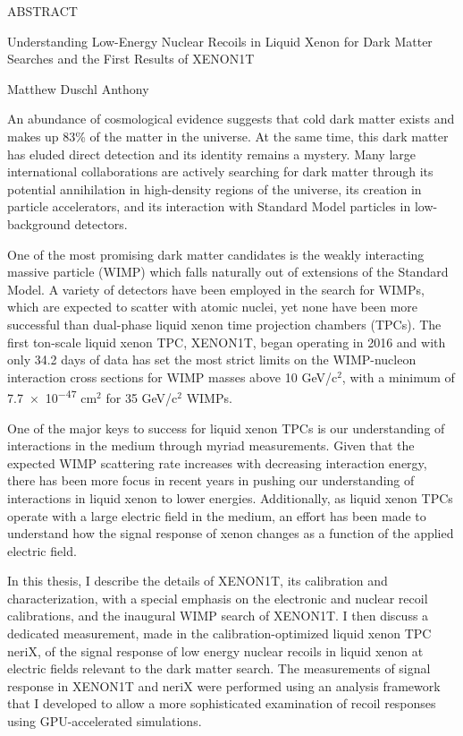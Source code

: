 
\pagestyle{empty} %
\begin{center}
  ABSTRACT

    Understanding Low-Energy Nuclear Recoils in Liquid Xenon for Dark Matter Searches and the First Results of XENON1T

    Matthew Duschl Anthony
\end{center}

An abundance of cosmological evidence suggests that cold dark matter exists and makes up 83\% of the matter in the universe.  At the same time, this dark matter has eluded direct detection and its identity remains a mystery.  Many large international collaborations are actively searching for dark matter through its potential annihilation in high-density regions of the universe, its creation in particle accelerators, and its interaction with Standard Model particles in low-background detectors.

One of the most promising dark matter candidates is the weakly interacting massive particle (WIMP) which falls naturally out of extensions of the Standard Model.  A variety of detectors have been employed in the search for WIMPs, which are expected to scatter with atomic nuclei, yet none have been more successful than dual-phase liquid xenon time projection chambers (TPCs).  The first ton-scale liquid xenon TPC, XENON1T, began operating in 2016 and with only 34.2 days of data has set the most strict limits on the WIMP-nucleon interaction cross sections for WIMP masses above 10 GeV/$\textrm{c}^2$, with a minimum of \num{7.7e-47} $\textrm{cm}^2$ for 35 GeV/$\textrm{c}^2$ WIMPs.

One of the major keys to success for liquid xenon TPCs is our understanding of interactions in the medium through myriad measurements.  Given that the expected WIMP scattering rate increases with decreasing interaction energy, there has been more focus in recent years in pushing our understanding of interactions in liquid xenon to lower energies.  Additionally, as liquid xenon TPCs operate with a large electric field in the medium, an effort has been made to understand how the signal response of xenon changes as a function of the applied electric field.      
   
In this thesis, I describe the details of XENON1T, its calibration and characterization, with a special emphasis on the electronic and nuclear recoil calibrations, and the inaugural WIMP search of XENON1T.    I then discuss a dedicated measurement, made in the calibration-optimized liquid xenon TPC neriX, of the signal response of low energy nuclear recoils in liquid xenon at electric fields relevant to the dark matter search.  The measurements of signal response in XENON1T and neriX were performed using an analysis framework that I developed to allow a more sophisticated examination of recoil responses using GPU-accelerated simulations.


